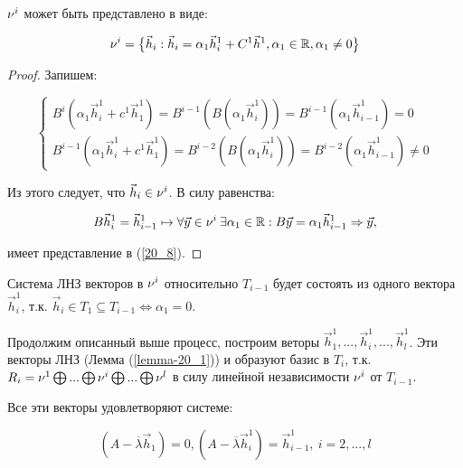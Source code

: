 \begin{proposition}
	$\nu^i$ может быть представлено в виде: 
	
	\begin{equation}\label{20_8}
		\nu^i = \big\lbrace \vec{h}_i: \vec{h}_i = \alpha_1 \vec{h}_i^1 + C^1 \vec{h}^1, \alpha_1 \in \mathbb{R} , \alpha_1 \neq 0 \big\rbrace
	\end{equation}
	
	\begin{proof}
		
		Запишем:
		
		\begin{equation*}
			\begin{cases}
				B^i ( \alpha_1\vec{h}_i^1 + c^1 \vec{h}_1^1) = B^{i - 1} (B(\alpha_1 \vec{h}_i^1 )) = B^{i - 1} (\alpha_1 \vec{h}_{i-1}^1) = 0 \\
				B^{i-1} ( \alpha_1\vec{h}_i^1 + c^1 \vec{h}_1^1) = B^{i - 2} (B(\alpha_1 \vec{h}_i^1 )) = B^{i - 2} (\alpha_1 \vec{h}_{i-1}^1) \neq 0
			\end{cases}
		\end{equation*}
		
		Из этого следует, что $\vec{h}_i \in \nu^i$. В силу равенства:
		
		\[B\vec{h}_i^1 = \vec{h}_{i-1}^1 \mapsto \forall \vec{y} \in \nu^i \: \exists \alpha_1 \in \mathbb{R} : B\vec{y} = \alpha_1\vec{h}_{i-1}^1 \Rightarrow \vec{y},\]
		
		имеет представление в (\ref{20_8}).
	\end{proof}
\end{proposition}

Система ЛНЗ векторов в $\nu^i$ относительно $T_{i-1}$ будет состоять из одного вектора $\vec{h}_i^1$, т.к. $\vec{h}_i \in T_1 \subseteq T_{i - 1} \Leftrightarrow \alpha_1 = 0$.

Продолжим описанный выше процесс, построим веторы $\vec{h}_1^1, ... , \vec{h}_i^1 , ... , \vec{h}_l^1$. Эти векторы ЛНЗ (Лемма (\ref{lemma-20_1})) и образуют базис в $T_i$, т.к. $R_i = \nu^1 \bigoplus ... \bigoplus \nu^i \bigoplus ... \bigoplus \nu^l$ в силу линейной независимости $\nu^i$ от $T_{i - 1}$.

Все эти векторы удовлетворяют системе:

\begin{equation}\label{20_9}
	(A - \overline{\lambda} \vec{h}_1) = 0, (A - \overline{\lambda} \vec{h}_i^1) = \vec{h}_{i-1}^1, \: i = 2,...,l 
\end{equation}

